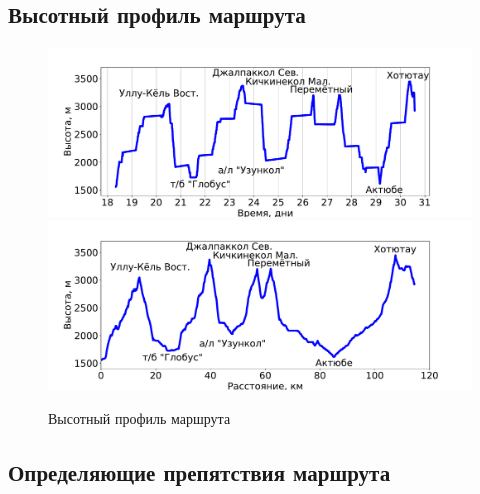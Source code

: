 \newpage
\subsection{Высотный профиль маршрута}

\begin{figure}[h!]
	\centering
	\includegraphics[width=0.92\linewidth]{../pics/elevation_vs_time}
	\includegraphics[width=0.92\linewidth]{../pics/elevation_vs_distance}
	\caption{Высотный профиль маршрута}
	\label{fig:heights}
\end{figure}

\newpage
\subsection{Определяющие препятствия маршрута}

